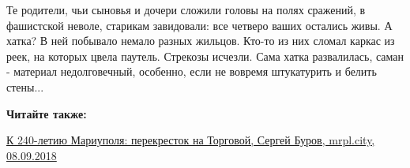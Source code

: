 Те родители, чьи сыновья и дочери сложили головы на полях сражений, в
фашистской неволе, старикам завидовали: все четверо ваших остались живы. А
хатка? В ней побывало немало разных жильцов. Кто-то из них сломал каркас из
реек, на которых цвела паутель. Стрекозы исчезли. Сама хатка развалилась,
саман - материал недолговечный, особенно, если не вовремя штукатурить и белить
стены...

\vspace{0.5cm}
\begin{minipage}{0.9\textwidth}
\textbf{Читайте также:}

\href{https://archive.org/details/08_09_2018.sergij_burov.mrpl_city.k_240_letiu_mariupolja_perekrestok_na_torgovoj}{%
К 240-летию Мариуполя: перекресток на Торговой, Сергей Буров, mrpl.city, 08.09.2018}
\end{minipage}
\vspace{0.5cm}
